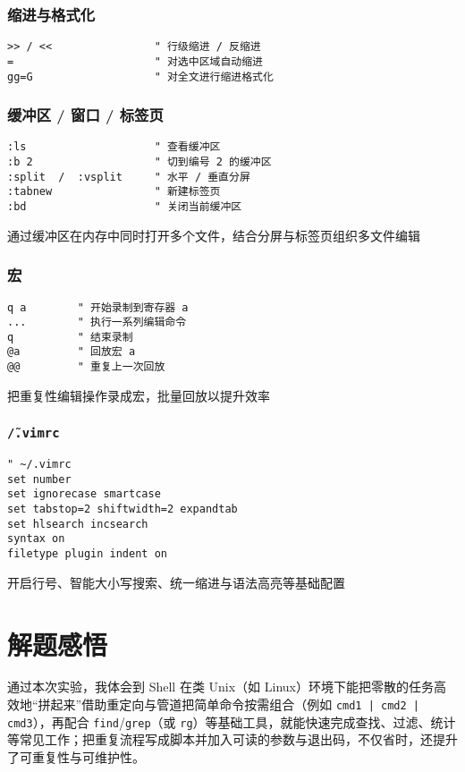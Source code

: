\documentclass[a4paper,12pt]{ctexart}
\begin{document}
\subsubsection{缩进与格式化}
\begin{lstlisting}
>> / <<                " 行级缩进 / 反缩进
=                      " 对选中区域自动缩进
gg=G                   " 对全文进行缩进格式化
\end{lstlisting}

\subsubsection{缓冲区 / 窗口 / 标签页}
\begin{lstlisting}
:ls                    " 查看缓冲区
:b 2                   " 切到编号 2 的缓冲区
:split  /  :vsplit     " 水平 / 垂直分屏
:tabnew                " 新建标签页
:bd                    " 关闭当前缓冲区
\end{lstlisting}
通过缓冲区在内存中同时打开多个文件，结合分屏与标签页组织多文件编辑

\subsubsection{宏}
\begin{lstlisting}
q a        " 开始录制到寄存器 a
...        " 执行一系列编辑命令
q          " 结束录制
@a         " 回放宏 a
@@         " 重复上一次回放
\end{lstlisting}
把重复性编辑操作录成宏，批量回放以提升效率

\subsubsection{\texttt{\~/.vimrc}}
\begin{lstlisting}
" ~/.vimrc
set number
set ignorecase smartcase
set tabstop=2 shiftwidth=2 expandtab
set hlsearch incsearch
syntax on
filetype plugin indent on
\end{lstlisting}
开启行号、智能大小写搜索、统一缩进与语法高亮等基础配置

\newpage
\section{解题感悟}

通过本次实验，我体会到 Shell 在类 Unix（如 Linux）环境下能把零散的任务高效地“拼起来”借助重定向与管道把简单命令按需组合（例如 \texttt{cmd1 | cmd2 | cmd3}），再配合 \texttt{find}/\texttt{grep}（或 \texttt{rg}）等基础工具，就能快速完成查找、过滤、统计等常见工作；把重复流程写成脚本并加入可读的参数与退出码，不仅省时，还提升了可重复性与可维护性。
\end{document}
